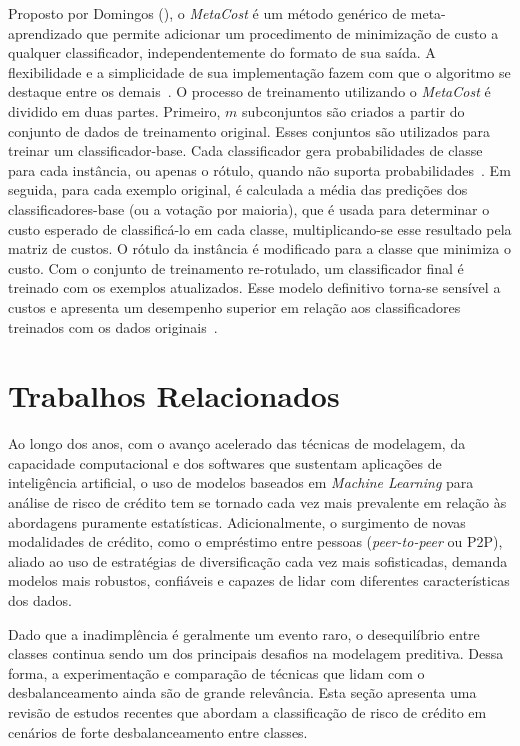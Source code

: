 Proposto por Domingos (\citeyear{Domingos1999}), o \textit{MetaCost} é um método genérico de meta-aprendizado que permite adicionar um procedimento de minimização de custo a qualquer classificador, independentemente do formato de sua saída. A flexibilidade e a simplicidade de sua implementação fazem com que o algoritmo se destaque entre os demais~\cite{FernndezCs2018, Wang2018}. O processo de treinamento utilizando o \textit{MetaCost} é dividido em duas partes. Primeiro, $m$ subconjuntos são criados a partir do conjunto de dados de treinamento original. Esses conjuntos são utilizados para treinar um classificador-base. Cada classificador gera probabilidades de classe para cada instância, ou apenas o rótulo, quando não suporta probabilidades~\cite{Araf2024}. Em seguida, para cada exemplo original, é calculada a média das predições dos classificadores-base (ou a votação por maioria), que é usada para determinar o custo esperado de classificá-lo em cada classe, multiplicando-se esse resultado pela matriz de custos. O rótulo da instância é modificado para a classe que minimiza o custo. Com o conjunto de treinamento re-rotulado, um classificador final é treinado com os exemplos atualizados. Esse modelo definitivo torna-se sensível a custos e apresenta um desempenho superior em relação aos classificadores treinados com os dados originais~\cite{Chen2021}.

\section{Trabalhos Relacionados}

Ao longo dos anos, com o avanço acelerado das técnicas de modelagem, da capacidade computacional e dos softwares que sustentam aplicações de inteligência artificial, o uso de modelos baseados em \textit{Machine Learning} para análise de risco de crédito tem se tornado cada vez mais prevalente em relação às abordagens puramente estatísticas. Adicionalmente, o surgimento de novas modalidades de crédito, como o empréstimo entre pessoas (\textit{peer-to-peer} ou P2P), aliado ao uso de estratégias de diversificação cada vez mais sofisticadas, demanda modelos mais robustos, confiáveis e capazes de lidar com diferentes características dos dados.

Dado que a inadimplência é geralmente um evento raro, o desequilíbrio entre classes continua sendo um dos principais desafios na modelagem preditiva. Dessa forma, a experimentação e comparação de técnicas que lidam com o desbalanceamento ainda são de grande relevância. Esta seção apresenta uma revisão de estudos recentes que abordam a classificação de risco de crédito em cenários de forte desbalanceamento entre classes.

